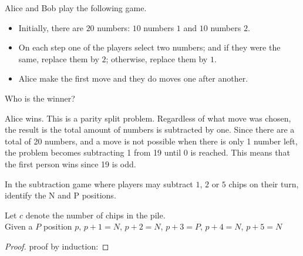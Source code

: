 \documentclass[addpoints,answers]{exam}
\begin{document}
    \pagestyle{headandfoot}
    \runningheadrule

    \firstpagefooter{}{}{}
    \runningfooter{}{}{}
    \begin{flushright}

        \vspace{0.2in}

    \end{flushright}

    \begin{questions}
        \question
            Alice and Bob play the following game.
            \begin{itemize}
                \item Initially, there are $20$ numbers: $10$ numbers $1$ and $10$ numbers
                    $2$.
                \item On each step one of the players select two numbers; and if they were
                    the same, replace them by $2$; otherwise, replace them by $1$.
                \item Alice make the first move and they do moves one after another.
            \end{itemize}
            Who is the winner?
            \begin{solutionorbox}[\stretch{1}]
							Alice wins. This is a parity split problem. Regardless of what move was
							chosen, the result is the total amount of numbers is subtracted by
							one. Since there are a total of 20 numbers, and a move is not
							possible when there is only 1 number left, the problem becomes
							subtracting 1 from 19 until 0 is reached. This means that the
							first person wins since 19 is odd.
            \end{solutionorbox}
            \newpage
 
        \question
            In the subtraction game where players may subtract $1$, $2$ or $5$ chips on
            their turn, identify the N and P positions.\\
            \begin{solutionorbox}[\stretch{1}]
							Let $c$ denote the number of chips in the pile.\\
							Given a $P$ position $p$, $p+1=N$, $p+2=N$, $p+3=P$, $p+4=N$, $p+5=N$
							\begin{proof} proof by induction:

\end{proof}
\end{solutionorbox}
\end{questions}
\end{document}
